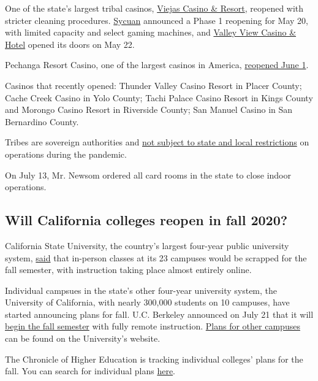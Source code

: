 One of the state's largest tribal casinos,
\href{https://viejas.com/}{Viejas Casino \& Resort}, reopened with
stricter cleaning procedures.
\href{https://www.sycuan.com/about-us/covid-19-updates/}{Sycuan}
announced a Phase 1 reopening for May 20, with limited capacity and
select gaming machines, and
\href{https://www.valleyviewcasino.com/}{Valley View Casino \& Hotel}
opened its doors on May 22.

Pechanga Resort Casino, one of the largest casinos in America,
\href{https://www.pechanga.com/}{reopened June 1}.

Casinos that recently opened: Thunder Valley Casino Resort in Placer
County; Cache Creek Casino in Yolo County; Tachi Palace Casino Resort in
Kings County and Morongo Casino Resort in Riverside County; San Manuel
Casino in San Bernardino County.

Tribes are sovereign authorities and
\href{https://www.nytimes.com/2020/05/28/us/california-virus-casinos.html}{not
subject to state and local restrictions} on operations during the
pandemic.

On July 13, Mr. Newsom ordered all card rooms in the state to close
indoor operations.

\hypertarget{will-california-colleges-reopen-in-fall-2020}{%
\subsection{Will California colleges reopen in fall
2020?}\label{will-california-colleges-reopen-in-fall-2020}}

California State University, the country's largest four-year public
university system,
\href{https://www.nytimes.com/2020/05/12/us/cal-state-online-classes.html}{said}
that in-person classes at its 23 campuses would be scrapped for the fall
semester, with instruction taking place almost entirely online.

Individual campsues in the state's other four-year university system,
the University of California, with nearly 300,000 students on 10
campuses, have started announcing plans for fall. U.C. Berkeley
announced on July 21 that it will
\href{https://news.berkeley.edu/2020/07/21/uc-berkeley-to-begin-fall-semester-with-remote-instruction/}{begin
the fall semester} with fully remote instruction.
\href{https://www.universityofcalifornia.edu/coronavirus}{Plans for
other campuses} can be found on the University's website.

The Chronicle of Higher Education is tracking individual colleges' plans
for the fall. You can search for individual plans
\href{https://www.chronicle.com/article/Here-s-a-List-of-Colleges-/248626}{here}.

